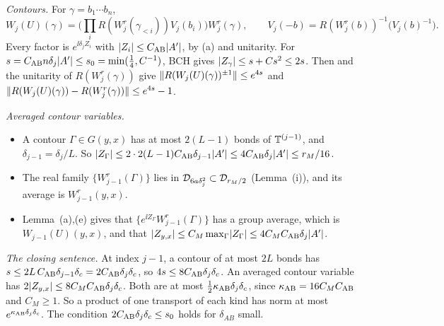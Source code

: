\begin{detail}
\begin{step}
\emph{Contours.} For $\gamma=b_1\cdots b_n$,
\[
W_j(U)(\gamma)=\Big(\prod_iR(W^r_j(\gamma_{<i}))V_j(b_i)\Big)W^r_j(\gamma),\qquad V_j(-b)=R(W^r_j(b))^{-1}\big(V_j(b)^{-1}\big).
\]
Every factor is $e^{\ii\delta_jZ_i}$ with $\lvert Z_i\rvert\le C_{\rm AB}\lvert A'\rvert$, by (a) and unitarity. For $s=C_{\rm AB}n\delta_j\lvert A'\rvert\le s_0=\min(\frac14,C^{-1})$, BCH gives $\lvert Z_\gamma\rvert\le s+Cs^2\le2s$. Then  and the unitarity of $R(W^r_j(\gamma))$ give $\lVert R(W_j(U)(\gamma))^{\pm1}\rVert\le e^{4s}$ and $\lVert R(W_j(U)(\gamma))-R(W^r_j(\gamma))\rVert\le e^{4s}-1$.

\emph{Averaged contour variables.}
\begin{itemize}
\item A contour $\Gamma\in G(y,x)$ has at most $2(L-1)$ bonds of $\mathbb T^{(j-1)}$, and $\delta_{j-1}=\delta_j/L$. So $\lvert Z_\Gamma\rvert\le2\cdot2(L-1)C_{\rm AB}\delta_{j-1}\lvert A'\rvert\le4C_{\rm AB}\delta_j\lvert A'\rvert\le r_M/16$.
\item The real family $\{W^r_{j-1}(\Gamma)\}$ lies in $\mathcal D_{6a\delta_j^2}\subset\mathcal D_{r_M/2}$ (Lemma~(i)), and its average is $W^r_{j-1}(y,x)$.
\item Lemma~(a),(e) gives that $\{e^{\ii Z_\Gamma}W^r_{j-1}(\Gamma)\}$ has a group average, which is $W_{j-1}(U)(y,x)$, and that $\lvert Z_{y,x}\rvert\le C_M\max_\Gamma\lvert Z_\Gamma\rvert\le4C_MC_{\rm AB}\delta_j\lvert A'\rvert$.
\end{itemize}

\emph{The closing sentence.} At index $j-1$, a contour of at most $2L$ bonds has $s\le2L\,C_{\rm AB}\delta_{j-1}\delta_c=2C_{\rm AB}\delta_j\delta_c$, so $4s\le8C_{\rm AB}\delta_j\delta_c$. An averaged contour variable has $2\lvert Z_{y,x}\rvert\le8C_MC_{\rm AB}\delta_j\delta_c$. Both are at most $\frac12\kappa_{\rm AB}\delta_j\delta_c$, since $\kappa_{\rm AB}=16C_MC_{\rm AB}$ and $C_M\ge1$. So a product of one transport of each kind has norm at most $e^{\kappa_{\rm AB}\delta_j\delta_c}$. The condition $2C_{\rm AB}\delta_j\delta_c\le s_0$ holds for $\delta_{AB}$ small.
\end{step}


\end{detail}
